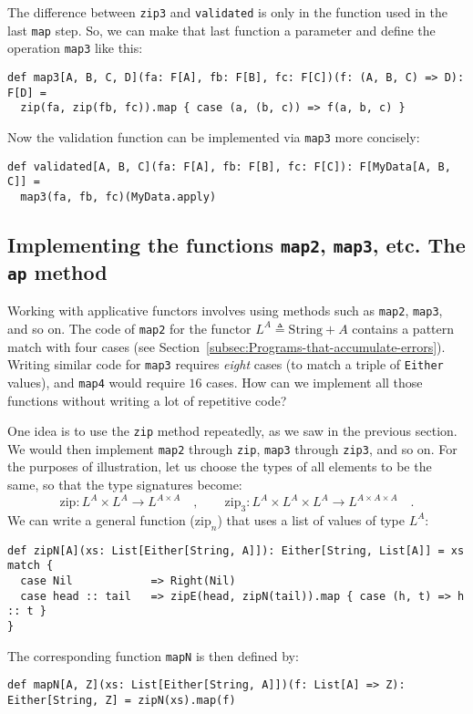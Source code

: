 The difference between \lstinline!zip3! and \lstinline!validated!
is only in the function used in the last \lstinline!map! step. So,
we can make that last function a parameter and define the operation
\lstinline!map3! like this:
\begin{lstlisting}
def map3[A, B, C, D](fa: F[A], fb: F[B], fc: F[C])(f: (A, B, C) => D): F[D] =
  zip(fa, zip(fb, fc)).map { case (a, (b, c)) => f(a, b, c) }
\end{lstlisting}
Now the validation function can be implemented via \lstinline!map3!
more concisely:
\begin{lstlisting}
def validated[A, B, C](fa: F[A], fb: F[B], fc: F[C]): F[MyData[A, B, C]] =
  map3(fa, fb, fc)(MyData.apply)
\end{lstlisting}


\subsection{Implementing the functions \texttt{map2}, \texttt{map3}, etc. The
\texttt{ap} method}

Working with applicative functors involves using methods such as \lstinline!map2!,
\lstinline!map3!, and so on. The code of \lstinline!map2! for the
functor $L^{A}\triangleq\text{String}+A$ contains a pattern match
with four cases (see Section~\ref{subsec:Programs-that-accumulate-errors}).
Writing similar code for \lstinline!map3! requires \emph{eight} cases
(to match a triple of \lstinline!Either! values), and \lstinline!map4!
would require $16$ cases. How can we implement all those functions
without writing a lot of repetitive code?

One idea is to use the \lstinline!zip! method repeatedly, as we saw
in the previous section. We would then implement \lstinline!map2!
through \lstinline!zip!, \lstinline!map3! through \lstinline!zip3!,
and so on. For the purposes of illustration, let us choose the types
of all elements to be the same, so that the type signatures become:
\[
\text{zip}:L^{A}\times L^{A}\rightarrow L^{A\times A}\quad,\quad\quad\text{zip}_{3}:L^{A}\times L^{A}\times L^{A}\rightarrow L^{A\times A\times A}\quad.
\]
We can write a general function ($\text{zip}_{n}$) that uses a list
of values of type $L^{A}$:
\begin{lstlisting}
def zipN[A](xs: List[Either[String, A]]): Either[String, List[A]] = xs match {
  case Nil            => Right(Nil)
  case head :: tail   => zipE(head, zipN(tail)).map { case (h, t) => h :: t }
}
\end{lstlisting}
The corresponding function \lstinline!mapN! is then defined by:
\begin{lstlisting}
def mapN[A, Z](xs: List[Either[String, A]])(f: List[A] => Z): Either[String, Z] = zipN(xs).map(f)
\end{lstlisting}


